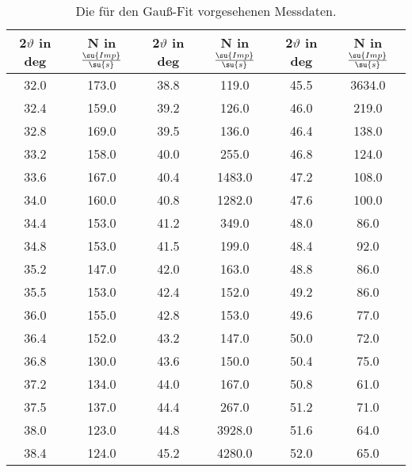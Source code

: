 \begin{table}
  \centering
  \caption{Die für den Gauß-Fit vorgesehenen Messdaten. }
  \label{tab:Gauß1}
  \begin{tabular}{c c | c c | c c}
    \toprule
    2$\vartheta$ in deg & N in $\frac{\su{Imp}}{\su{s}}$ & 2$\vartheta$ in deg &
    N in $\frac{\su{Imp}}{\su{s}}$ & 2$\vartheta$ in deg & N in $\frac{\su{Imp}}{\su{s}}$ \\
    \midrule
    32.0 & 173.0 & 38.8 & 119.0  & 45.5 & 3634.0 \\
    32.4 & 159.0 & 39.2 & 126.0  & 46.0 & 219.0  \\
    32.8 & 169.0 & 39.5 & 136.0  & 46.4 & 138.0  \\
    33.2 & 158.0 & 40.0 & 255.0  & 46.8 & 124.0  \\
    33.6 & 167.0 & 40.4 & 1483.0 & 47.2 & 108.0  \\
    34.0 & 160.0 & 40.8 & 1282.0 & 47.6 & 100.0  \\
    34.4 & 153.0 & 41.2 & 349.0  & 48.0 & 86.0   \\
    34.8 & 153.0 & 41.5 & 199.0  & 48.4 & 92.0   \\
    35.2 & 147.0 & 42.0 & 163.0  & 48.8 & 86.0   \\
    35.5 & 153.0 & 42.4 & 152.0  & 49.2 & 86.0   \\
    36.0 & 155.0 & 42.8 & 153.0  & 49.6 & 77.0   \\
    36.4 & 152.0 & 43.2 & 147.0  & 50.0 & 72.0   \\
    36.8 & 130.0 & 43.6 & 150.0  & 50.4 & 75.0   \\
    37.2 & 134.0 & 44.0 & 167.0  & 50.8 & 61.0   \\
    37.5 & 137.0 & 44.4 & 267.0  & 51.2 & 71.0   \\
    38.0 & 123.0 & 44.8 & 3928.0 & 51.6 & 64.0   \\
    38.4 & 124.0 & 45.2 & 4280.0 & 52.0 & 65.0   \\
    \bottomrule
  \end{tabular}
\end{table}
